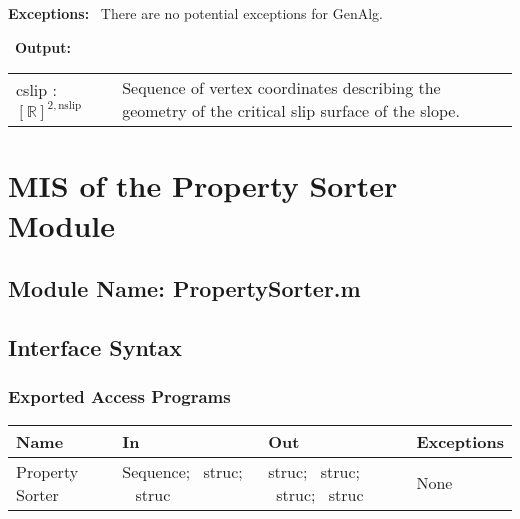 \documentclass[12pt]{article}
\begin{document}
\noindent \textbf{Exceptions:} ~\newline\noindent There are
no potential exceptions for GenAlg.

~\newline\noindent \textbf{Output:}
\begin{longtable}{p{} p{}}
  cslip : $[\mathbb{R}]^{2,\text{nslip}}$ & Sequence of vertex
  coordinates describing the geometry of the critical slip surface of
  the slope.
\end{longtable}


\section{MIS of the Property Sorter Module} \label{sec:PropSortMod}

\subsection{Module Name: PropertySorter.m}

\subsection{Interface Syntax}

\subsubsection{Exported Access Programs}
\begin{center}
\renewcommand*{\arraystretch}{1.5}
\begin{tabular}{| p{} | p{} | 
p{} | p{} |} \hline 

  \textbf{Name} & \textbf{In} & \textbf{Out} & \textbf{Exceptions}
  \\ \hline

  Property Sorter & Sequence; ~\newline struc; ~\newline
  struc & struc; ~\newline struc; ~\newline struc; ~\newline struc &
  None \\ \hline
\end{tabular}
\end{center}
\end{document}
